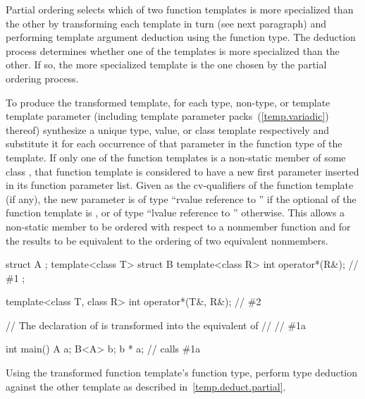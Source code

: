 \pnum
Partial ordering selects which of two function templates is more
specialized than the other by transforming each template in turn
(see next paragraph) and performing template argument deduction
using the function type.
The deduction process determines whether
one of the templates is more specialized than the other. If so, the
more specialized template is the one chosen by the partial ordering
process.

\pnum
To produce the transformed template, for each type, non-type, or template
template parameter (including template parameter packs~(\ref{temp.variadic})
thereof) synthesize a unique type, value, or class template
respectively and substitute it for each occurrence of that parameter
in the function type of the template.
If only one of the function templates is a non-static member of some
class , that function
template is considered to have a new first parameter inserted in its function
parameter list. Given \cv{} as the cv-qualifiers of the function
template (if any), the new parameter is of type ``rvalue reference to
\cv{} '' if the optional  of the
function template is \tcode{\&\&}, or of type ``lvalue reference to
\cv{} '' otherwise. \enternote This allows a non-static
member to be ordered with respect to a nonmember function and for the results
to be equivalent to the ordering of two equivalent nonmembers. \exitnote
\enterexample
\begin{codeblock}
struct A { };
template<class T> struct B {
  template<class R> int operator*(R&);              // \#1
};

template<class T, class R> int operator*(T&, R&);   // \#2

// The declaration of  is transformed into the equivalent of
// \quad\quad\quad// \#1a

int main() {
  A a;
  B<A> b;
  b * a;                                            // calls \#1a
}
\end{codeblock}
\exitexample

\pnum
Using the transformed function template's function type,
perform type deduction against the other template as described in~\ref{temp.deduct.partial}.

\enterexample


